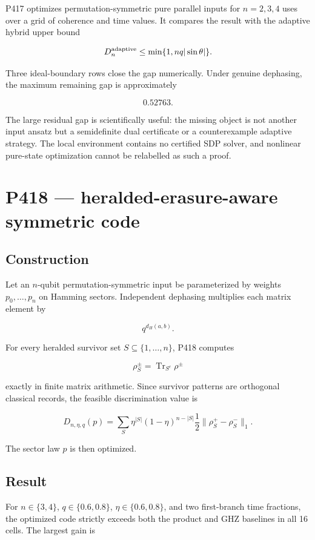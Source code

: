 \documentclass[11pt,a4paper,openany]{report}
\begin{document}
P417 optimizes permutation-symmetric pure parallel inputs for \(n=2,3,4\) uses over a grid of coherence and time values. It compares the result with the adaptive hybrid upper bound

\[
D_n^{\rm adaptive}
\le\min\{1,nq|\sin\theta|\}.
\]

Three ideal-boundary rows close the gap numerically. Under genuine dephasing, the maximum remaining gap is approximately

\[
0.52763.
\]

The large residual gap is scientifically useful: the missing object is not another input ansatz but a semidefinite dual certificate or a counterexample adaptive strategy. The local environment contains no certified SDP solver, and nonlinear pure-state optimization cannot be relabelled as such a proof.

\chapter{P418 --- heralded-erasure-aware symmetric code}

\section{Construction}

Let an \(n\)-qubit permutation-symmetric input be parameterized by weights \(p_0,\ldots,p_n\) on Hamming sectors. Independent dephasing multiplies each matrix element by

\[
q^{d_H(a,b)}.
\]

For every heralded survivor set \(S\subseteq\{1,\ldots,n\}\), P418 computes

\[
\rho_S^\pm=\operatorname{Tr}_{S^c}\rho^\pm
\]

exactly in finite matrix arithmetic. Since survivor patterns are orthogonal classical records, the feasible discrimination value is

\[
D_{n,\eta,q}(p)
=\sum_S
\eta^{|S|}(1-\eta)^{n-|S|}
\frac12\|\rho_S^+-\rho_S^-\|_1.
\]

The sector law \(p\) is then optimized.

\section{Result}

For \(n\in\{3,4\}\), \(q\in\{0.6,0.8\}\), \(\eta\in\{0.6,0.8\}\), and two first-branch time fractions, the optimized code strictly exceeds both the product and GHZ baselines in all 16 cells. The largest gain is
\end{document}
